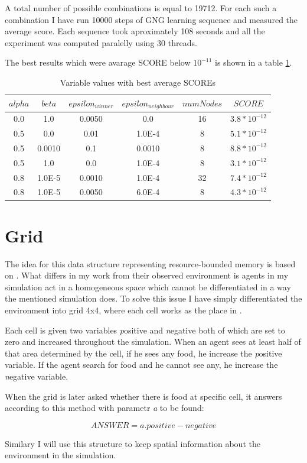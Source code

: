 A total number of possible combinations is equal to 19712. For each such a combination I have run 10000 steps of GNG learning sequence and measured the average score. Each sequence took aproximately 108 seconds and all the experiment was computed paralelly using 30 threads.

The best results which were avarage SCORE below $10^{-11}$ is shown in a table \ref{usedalgo:gngexperimentresults}.

\begin{table}
\begin{center}
\begin{tabular}{ccccc|c}

$alpha$ & $beta$ & $epsilon_{winner}$ & $epsilon_{neighbour}$ & $numNodes$ & $SCORE$ \\
\hline
0.0 & 1.0 & 0.0050 & 0.0 & 16 & $3.8*10^{-12}$ \\
0.5 & 0.0 & 0.01 & 1.0E-4 & 8 & $5.1*10^{-12}$ \\   
0.5 & 0.0010 & 0.1 & 0.0010 & 8 & $8.8*10^{-12}$ \\ 
0.5 & 1.0 & 0.0 & 1.0E-4 & 8 & $3.1*10^{-12}$ \\     
0.8 & 1.0E-5 & 0.0010 & 1.0E-4 & 32 & $7.4*10^{-12}$ \\
0.8 & 1.0E-5 & 0.0050 & 6.0E-4 & 8 & $4.3*10^{-12}$ \\

\end{tabular}      
\caption{\label{usedalgo:gngexperimentresults}Variable values with best average SCOREs}
\end{center}
\end{table}

\section{Grid}

The idea for this data structure representing resource-bounded memory is based on \cite{Brom:placeandobjects}. What differs in my work from their observed environment is agents in my simulation act in a homogeneous space which cannot be differentiated in a way the mentioned simulation does. To solve this issue I have simply differentiated the environment into grid 4x4, where each cell works as the place in \cite{Brom:placeandobjects}. 

Each cell is given two variables {\emph positive} and {\emph negative} both of which are set to zero and increased throughout the simulation. When an agent sees at least half of that area determined by the cell, if he sees any food, he increase the {\emph positive} variable. If the agent search for food and he cannot see any, he increase the {\emph negative} variable.

When the grid is later asked whether there is food at specific cell, it answers according to this method with parametr {\emph a} to be found:

\begin{equation} ANSWER = a.positive - negative 
\end{equation}
 
Similary I will use this structure to keep spatial information about the environment in the simulation.
